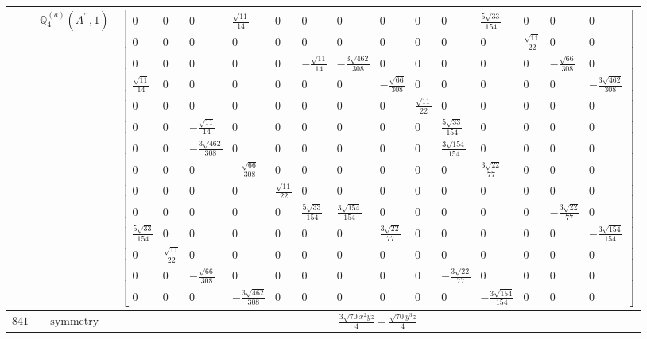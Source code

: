 \documentclass[fleqn,8pt,landscape]{jsarticle}
\begin{document}
\begin{longtable}{ccc}
$  $ & $ \mathbb{Q}_{4}^{(a)}(A^{\prime\prime},1) $ & $ \begin{bmatrix} 0 & 0 & 0 & \frac{\sqrt{11}}{14} & 0 & 0 & 0 & 0 & 0 & 0 & \frac{5 \sqrt{33}}{154} & 0 & 0 & 0 \\ 0 & 0 & 0 & 0 & 0 & 0 & 0 & 0 & 0 & 0 & 0 & \frac{\sqrt{11}}{22} & 0 & 0 \\ 0 & 0 & 0 & 0 & 0 & - \frac{\sqrt{11}}{14} & - \frac{3 \sqrt{462}}{308} & 0 & 0 & 0 & 0 & 0 & - \frac{\sqrt{66}}{308} & 0 \\ \frac{\sqrt{11}}{14} & 0 & 0 & 0 & 0 & 0 & 0 & - \frac{\sqrt{66}}{308} & 0 & 0 & 0 & 0 & 0 & - \frac{3 \sqrt{462}}{308} \\ 0 & 0 & 0 & 0 & 0 & 0 & 0 & 0 & \frac{\sqrt{11}}{22} & 0 & 0 & 0 & 0 & 0 \\ 0 & 0 & - \frac{\sqrt{11}}{14} & 0 & 0 & 0 & 0 & 0 & 0 & \frac{5 \sqrt{33}}{154} & 0 & 0 & 0 & 0 \\ 0 & 0 & - \frac{3 \sqrt{462}}{308} & 0 & 0 & 0 & 0 & 0 & 0 & \frac{3 \sqrt{154}}{154} & 0 & 0 & 0 & 0 \\ 0 & 0 & 0 & - \frac{\sqrt{66}}{308} & 0 & 0 & 0 & 0 & 0 & 0 & \frac{3 \sqrt{22}}{77} & 0 & 0 & 0 \\ 0 & 0 & 0 & 0 & \frac{\sqrt{11}}{22} & 0 & 0 & 0 & 0 & 0 & 0 & 0 & 0 & 0 \\ 0 & 0 & 0 & 0 & 0 & \frac{5 \sqrt{33}}{154} & \frac{3 \sqrt{154}}{154} & 0 & 0 & 0 & 0 & 0 & - \frac{3 \sqrt{22}}{77} & 0 \\ \frac{5 \sqrt{33}}{154} & 0 & 0 & 0 & 0 & 0 & 0 & \frac{3 \sqrt{22}}{77} & 0 & 0 & 0 & 0 & 0 & - \frac{3 \sqrt{154}}{154} \\ 0 & \frac{\sqrt{11}}{22} & 0 & 0 & 0 & 0 & 0 & 0 & 0 & 0 & 0 & 0 & 0 & 0 \\ 0 & 0 & - \frac{\sqrt{66}}{308} & 0 & 0 & 0 & 0 & 0 & 0 & - \frac{3 \sqrt{22}}{77} & 0 & 0 & 0 & 0 \\ 0 & 0 & 0 & - \frac{3 \sqrt{462}}{308} & 0 & 0 & 0 & 0 & 0 & 0 & - \frac{3 \sqrt{154}}{154} & 0 & 0 & 0 \end{bmatrix} $ \\ \hline
$ 841 $ & $ \text{symmetry} $ & $ \frac{3 \sqrt{70} x^{2} y z}{4} - \frac{\sqrt{70} y^{3} z}{4} $ \\

\end{longtable}
\end{document}
